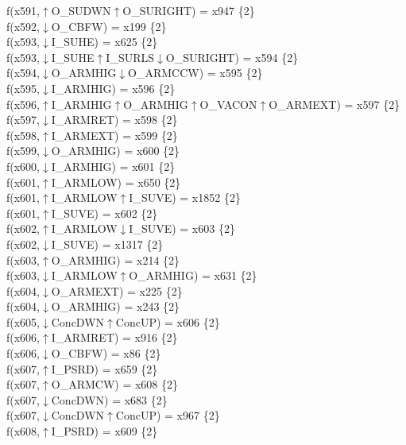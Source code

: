 f(x591,$\uparrow$O\_SUDWN$\uparrow$O\_SURIGHT) = x947 \{2\} \\  
f(x592,$\downarrow$O\_CBFW) = x199 \{2\} \\  
f(x593,$\downarrow$I\_SUHE) = x625 \{2\} \\  
f(x593,$\downarrow$I\_SUHE$\uparrow$I\_SURLS$\downarrow$O\_SURIGHT) = x594 \{2\} \\  
f(x594,$\downarrow$O\_ARMHIG$\downarrow$O\_ARMCCW) = x595 \{2\} \\  
f(x595,$\downarrow$I\_ARMHIG) = x596 \{2\} \\  
f(x596,$\uparrow$I\_ARMHIG$\uparrow$O\_ARMHIG$\uparrow$O\_VACON$\uparrow$O\_ARMEXT) = x597 \{2\} \\  
f(x597,$\downarrow$I\_ARMRET) = x598 \{2\} \\  
f(x598,$\uparrow$I\_ARMEXT) = x599 \{2\} \\  
f(x599,$\downarrow$O\_ARMHIG) = x600 \{2\} \\  
f(x600,$\downarrow$I\_ARMHIG) = x601 \{2\} \\  
f(x601,$\uparrow$I\_ARMLOW) = x650 \{2\} \\  
f(x601,$\uparrow$I\_ARMLOW$\uparrow$I\_SUVE) = x1852 \{2\} \\  
f(x601,$\uparrow$I\_SUVE) = x602 \{2\} \\  
f(x602,$\uparrow$I\_ARMLOW$\downarrow$I\_SUVE) = x603 \{2\} \\  
f(x602,$\downarrow$I\_SUVE) = x1317 \{2\} \\  
f(x603,$\uparrow$O\_ARMHIG) = x214 \{2\} \\  
f(x603,$\downarrow$I\_ARMLOW$\uparrow$O\_ARMHIG) = x631 \{2\} \\  
f(x604,$\downarrow$O\_ARMEXT) = x225 \{2\} \\  
f(x604,$\downarrow$O\_ARMHIG) = x243 \{2\} \\  
f(x605,$\downarrow$ConcDWN$\uparrow$ConcUP) = x606 \{2\} \\  
f(x606,$\uparrow$I\_ARMRET) = x916 \{2\} \\  
f(x606,$\downarrow$O\_CBFW) = x86 \{2\} \\  
f(x607,$\uparrow$I\_PSRD) = x659 \{2\} \\  
f(x607,$\uparrow$O\_ARMCW) = x608 \{2\} \\  
f(x607,$\downarrow$ConcDWN) = x683 \{2\} \\  
f(x607,$\downarrow$ConcDWN$\uparrow$ConcUP) = x967 \{2\} \\  
f(x608,$\uparrow$I\_PSRD) = x609 \{2\} \\  
